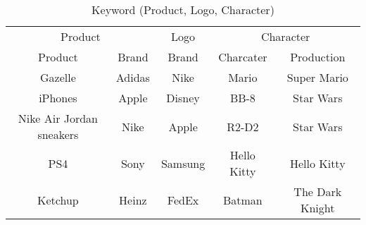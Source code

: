 \begin{table}[ht]
\vspace{-0.1in}
\caption{Keyword (Product, Logo, Character)}
\label{table:table_keyword}
\centering
    \begin{adjustbox}{width=1\linewidth}
        \small 
        \begin{tabular}{ccccc}
        \toprule
        \multicolumn{2}{c|}{Product}                                                                                                                               & Logo                                & \multicolumn{2}{|c}{Character}                                           \\ 
        Product                                                                                              & \multicolumn{1}{c|}{Brand}                                              & Brand                               & \multicolumn{1}{|c}{Charcater}                                  & Production                 \\ \midrule
        \multicolumn{1}{c|}{Gazelle}                                                                         & \multicolumn{1}{c|}{Adidas}                        & \multicolumn{1}{c|}{Nike}           & \multicolumn{1}{c|}{Mario}                 & Super Mario                \\
        \multicolumn{1}{c|}{iPhones}                                                                         & \multicolumn{1}{c|}{Apple}                         & \multicolumn{1}{c|}{Disney}         & \multicolumn{1}{c|}{BB-8}                  & Star Wars                  \\
        \multicolumn{1}{c|}{Nike Air Jordan sneakers}                                                        & \multicolumn{1}{c|}{Nike}                          & \multicolumn{1}{c|}{Apple}          & \multicolumn{1}{c|}{R2-D2}                 & Star Wars                  \\
        \multicolumn{1}{c|}{PS4}                                                                             & \multicolumn{1}{c|}{Sony}                   & \multicolumn{1}{c|}{Samsung}        & \multicolumn{1}{c|}{Hello Kitty}           & Hello Kitty                \\
        \multicolumn{1}{c|}{Ketchup}                                                                         & \multicolumn{1}{c|}{Heinz}                         & \multicolumn{1}{c|}{FedEx}          & \multicolumn{1}{c|}{Batman}                & The Dark Knight            \\

\end{tabular}
\end{adjustbox}
\end{table}
